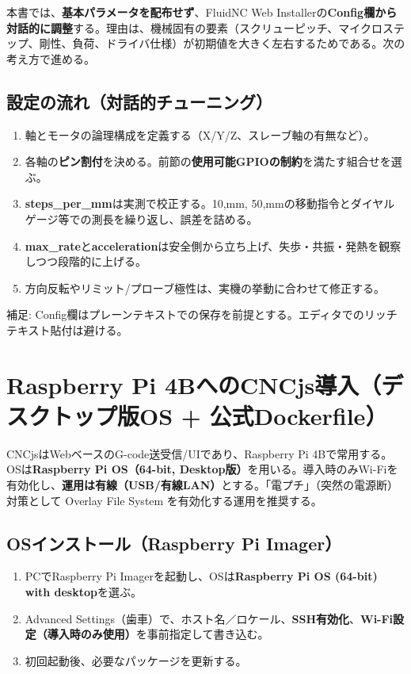 \documentclass[uplatex,dvipdfmx]{ujarticle}
\begin{document}
本書では、\textbf{基本パラメータを配布せず}、FluidNC Web Installerの\textbf{Config欄から対話的に調整}する。理由は、機械固有の要素（スクリューピッチ、マイクロステップ、剛性、負荷、ドライバ仕様）が初期値を大きく左右するためである。次の考え方で進める。

\subsection*{設定の流れ（対話的チューニング）}
\begin{enumerate}
\item 軸とモータの論理構成を定義する（X/Y/Z、スレーブ軸の有無など）。
\item 各軸の\textbf{ピン割付}を決める。前節の\textbf{使用可能GPIOの制約}を満たす組合せを選ぶ。
\item \textbf{steps\_per\_mm}は実測で校正する。10,mm, 50,mmの移動指令とダイヤルゲージ等での測長を繰り返し、誤差を詰める。
\item \textbf{max\_rate}と\textbf{acceleration}は安全側から立ち上げ、失歩・共振・発熱を観察しつつ段階的に上げる。
\item 方向反転やリミット/プローブ極性は、実機の挙動に合わせて修正する。
\end{enumerate}

\noindent 補足: Config欄はプレーンテキストでの保存を前提とする。エディタでのリッチテキスト貼付は避ける。

\section{Raspberry Pi 4BへのCNCjs導入（デスクトップ版OS + 公式Dockerfile）}

CNCjsはWebベースのG-code送受信/UIであり、Raspberry Pi 4Bで常用する。OSは\textbf{Raspberry Pi OS（64-bit, Desktop版）}を用いる。導入時のみWi-Fiを有効化し、\textbf{運用は有線（USB/有線LAN）}とする。「電プチ」（突然の電源断）対策として Overlay File System を有効化する運用を推奨する。

\subsection*{OSインストール（Raspberry Pi Imager）}
\begin{enumerate}
\item PCでRaspberry Pi Imagerを起動し、OSは\textbf{Raspberry Pi OS (64-bit) with desktop}を選ぶ。
\item Advanced Settings（歯車）で、ホスト名／ロケール、\textbf{SSH有効化}、\textbf{Wi-Fi設定（導入時のみ使用）}を事前指定して書き込む。
\item 初回起動後、必要なパッケージを更新する。
\end{enumerate}
\end{document}
